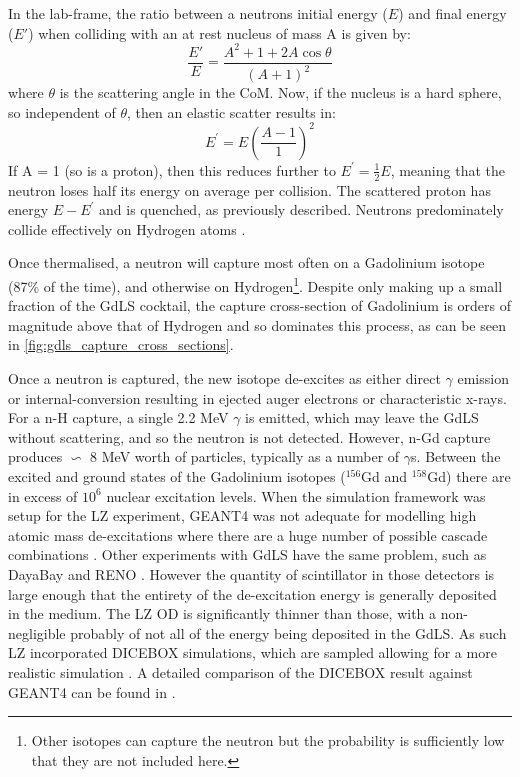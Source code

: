 In the lab-frame, the ratio between a neutrons initial energy ($E$) and final energy ($E'$) when colliding with an at rest nucleus of mass A is given by:
\begin{equation}
    \frac{E'}{E} = \frac{A^2 + 1 + 2A\cos{\theta}}{(A + 1)^2}
\end{equation}
where $\theta$ is the scattering angle in the CoM.
Now, if the nucleus is a hard sphere, so independent of $\theta$, then an elastic scatter results in:
\begin{equation}
    E^{'} = E(\frac{A-1}{1})^{2}
\end{equation}
If A = 1 (so is a proton), then this reduces further to $E^{'} = \frac{1}{2}E$, meaning that the neutron loses half its energy on average per collision.
The scattered proton has energy $E - E^{'}$ and is quenched, as previously described.
Neutrons predominately collide effectively on Hydrogen atoms \cite{neutron_thermalisation_and_capture_ref}.

\par
Once thermalised, a neutron will capture most often on a Gadolinium isotope (87\% of the time), and otherwise on Hydrogen\footnote{Other isotopes can capture the neutron but the probability is sufficiently low that they are not included here.}.
Despite only making up a small fraction of the GdLS cocktail, the capture cross-section of Gadolinium is orders of magnitude above that of Hydrogen and so dominates this process, as can be seen in \autoref{fig:gdls_capture_cross_sections}.



\par
Once a neutron is captured, the new isotope de-excites as either direct $\gamma$ emission or internal-conversion resulting in ejected auger electrons or characteristic x-rays.
For a n-H capture, a single 2.2 MeV $\gamma$ is emitted, which may leave the GdLS without scattering, and so the neutron is not detected.
However, n-Gd capture produces $\backsim$ 8 MeV worth of particles, typically as a number of $\gamma$s.
Between the excited and ground states of the Gadolinium isotopes (${}^{156}$Gd and ${}^{158}$Gd) there are in excess of $10^{6}$ nuclear excitation levels.
When the simulation framework was setup for the LZ experiment, GEANT4 was not adequate for modelling high atomic mass de-excitations where there are a huge number of possible cascade combinations \cite{ucsb_gdls_dicebox_simulations_ref}.
Other experiments with GdLS have the same problem, such as DayaBay \cite{dayabay_overview_ref} and RENO \cite{reno_overview_ref}.
However the quantity of scintillator in those detectors is large enough that the entirety of the de-excitation energy is generally deposited in the medium.
The LZ OD is significantly thinner than those, with a non-negligible probably of not all of the energy being deposited in the GdLS.
As such LZ incorporated DICEBOX \cite{dicebox_simulations_ref} simulations, which are sampled allowing for a more realistic simulation \cite{lz_simulations_ref}.
A detailed comparison of the DICEBOX result against GEANT4 can be found in \cite{ucsb_gdls_dicebox_simulations_ref}.

